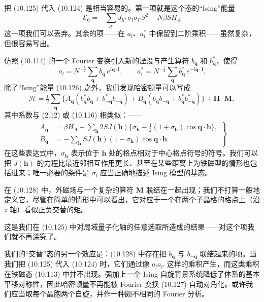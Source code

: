 把 (10.125) 代入 (10.124) 是相当容易的。第一项就是这个态的“Ising”能量
\begin{equation*}
\mathcal{E}_0 = -\sum_{ll'} J_{ll'}\, \sigma_l \sigma_{l'} S^2 - N\beta S H_A \tag{10.126}
\end{equation*}
这一项我们可以丢弃。其余的项——在 $a_l$、$a_l^*$ 中保留到二阶乘积——虽然复杂，但很容易写出。

仿照 (10.114) 的一个 Fourier 变换引入新的湮没与产生算符 $b_{\mathbf{q}}$ 和 $b_{\mathbf{q}}^*$，使得
\begin{equation*}
a_l = N^{-\frac{1}{2}} \sum_{\mathbf{q}} b_{\mathbf{q}}\, e^{i\mathbf{q}\cdot\mathbf{l}}, \qquad a_l^* = N^{-\frac{1}{2}} \sum_{\mathbf{q}} b_{\mathbf{q}}^*\, e^{-i\mathbf{q}\cdot\mathbf{l}}. \tag{10.127}
\end{equation*}
除了“Ising”能量 (10.126) 之外，我们发现哈密顿量可以写成
\begin{equation*}
\mathcal{H} = \tfrac{1}{2} \sum_{\mathbf{q}} \bigl\{ A_{\mathbf{q}} (b_{\mathbf{q}}^* b_{\mathbf{q}} + b_{-\mathbf{q}}^* b_{-\mathbf{q}}) + B_{\mathbf{q}} (b_{\mathbf{q}} b_{-\mathbf{q}} + b_{\mathbf{q}}^* b_{-\mathbf{q}}^*) \bigr\} + \mathbf{H}\cdot\mathbf{M}, \tag{10.128}
\end{equation*}
其中系数与 (2.12) 或 (10.116) 相类似：——
\begin{align*}
\left.
\begin{aligned}
A_{\mathbf{q}} &= \beta H_A + \sum_{\mathbf{h}} 2S J(\mathbf{h}) \bigl\{ \sigma_{\mathbf{h}} - \tfrac{1}{2}(1 + \sigma_{\mathbf{h}})\cos\mathbf{q}\cdot\mathbf{h} \bigr\}, \\
B_{\mathbf{q}} &= -\sum_{\mathbf{h}} S J(\mathbf{h})(1 - \sigma_{\mathbf{h}})\cos\mathbf{q}\cdot\mathbf{h}.
\end{aligned}
\right\} \tag{10.129}
\end{align*}
在这些表达式中，$\sigma_{\mathbf{h}}$ 表示位于 $\mathbf{h}$ 处的格点相对于中心格点符号的符号。我们可以把 $J(\mathbf{h})$ 的力程比最近邻相互作用更长、甚至在某些距离上为铁磁型的情形也包括进来；唯一必要的条件是 $\sigma_l$ 应当正确地描述 Ising 模型的基态。

在 (10.128) 中，外磁场与一个复杂的算符 $\mathbf{M}$ 联结在一起出现；我们不打算一般地定义它，尽管在简单的情形中可以看出，它对应于一个在两个子晶格的格点上（沿 $z$ 轴）看似正负交替的矩。

这是我们在 (10.125) 中对局域量子化轴的任意选取所造成的结果——对这个项我们就不再深究了。

我们的“交替”态的另一个效应是：(10.128) 中存在把 $b_{\mathbf{q}}$ 与 $b_{-\mathbf{q}}$ 联结起来的项。当我们把 (10.125) 代入 (10.124) 时，它们通过像 $a_l a_{l'}$ 这样的乘积产生，而这类乘积在铁磁态 (10.113) 中并不出现。强加上一个 Ising 自旋背景系统降低了体系的基本平移对称性，因此哈密顿量不再能被 Fourier 变换 (10.127) 自动对角化。或许我们应当取每个晶胞两个自旋，并作一种颇不相同的 Fourier 分析。

